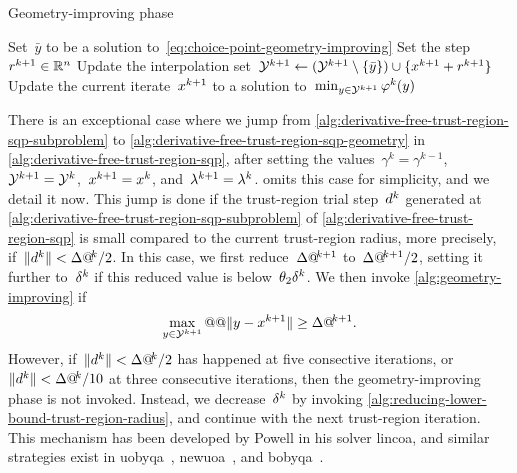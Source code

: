 \begin{algorithm}
    \caption{Geometry-improving phase}
    \label{alg:geometry-improving}
    \DontPrintSemicolon
    \onehalfspacing
    Set~$\bar{y}$ to be a solution to~\cref{eq:choice-point-geometry-improving}\;
    Set the step~$\rstep[k + 1] \in \R^n$\;
    Update the interpolation set~$\xpt[k + 1] \gets (\xpt[k + 1] \setminus \set{\bar{y}}) \cup \set{\iter[k + 1] + \rstep[k + 1]}$\;
    Update the current iterate~$\iter[k + 1]$ to a solution to~$\min_{y \in \xpt[k + 1]} \merit[k](y)$ \label{alg:geometry-improving-iterate}\;
\end{algorithm}

There is an exceptional case where we jump from \cref{alg:derivative-free-trust-region-sqp-subproblem} to \cref{alg:derivative-free-trust-region-sqp-geometry} in \cref{alg:derivative-free-trust-region-sqp}, after setting the values~$\gamma^k = \gamma^{k - 1}$,~$\xpt[k + 1] = \xpt[k]$,~$\iter[k + 1] = \iter[k]$, and~$\lm[k + 1] = \lm[k]$.
 omits this case for simplicity, and we detail it now.
This jump is done if the trust-region trial step~$\step[k]$ generated at \cref{alg:derivative-free-trust-region-sqp-subproblem} of \cref{alg:derivative-free-trust-region-sqp} is small compared to the current trust-region radius, more precisely, if~$\norm{\step[k]} < \rad[k] / 2$.
In this case, we first reduce~$\rad[k + 1]$ to~$\rad[k + 1] / 2$, setting it further to~$\radlb[k]$ if this reduced value is below~$\theta_2 \radlb[k]$.
We then invoke \cref{alg:geometry-improving} if
\begin{equation*}
    \max_{y \in \xpt[k + 1]} @@ \norm{y - \iter[k + 1]} \ge \rad[k + 1].
\end{equation*}
However, if~$\norm{\step[k]} < \rad[k] / 2$ has happened at five consective iterations, or~$\norm{\step[k]} < \rad[k] / 10$ at three consecutive iterations, then the geometry-improving phase is not invoked.
Instead, we decrease~$\radlb[k]$ by invoking \cref{alg:reducing-lower-bound-trust-region-radius}, and continue with the next trust-region iteration.
This mechanism has been developed by Powell in his solver \gls{lincoa}, and similar strategies exist in \gls{uobyqa}~\cite{Powell_2002}, \gls{newuoa}~\cite{Powell_2006}, and \gls{bobyqa}~\cite{Powell_2009}.

